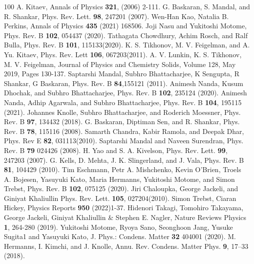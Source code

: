 \documentclass[aps,amsmath,twocolumn,amssymb,floatfix,showpacs,superscriptaddress,nofootinbib,longbibliography]{revtex4-1}
\begin{document}
{}
\begin{thebibliography}{100}
A. Kitaev, Annals of Physics {\bf 321}, (2006) 2-111.
G. Baskaran, S. Mandal, and R. Shankar, Phys. Rev. Lett. {\bf 98}, 247201 (2007).
Wen-Han Kao, Natalia B. Perkins, Annals of Physics {\bf 435} (2021) 168506.
 Joji Nasu and Yukitoshi Motome, Phys. Rev. B {\bf 102}, 054437 (2020). 
Tathagata Chowdhury, Achim Rosch, and Ralf Bulla, Phys. Rev. B {\bf 101}, 115133(2020).
 K. S. Tikhonov, M. V. Feigelman,  and A. Yu. Kitaev, Phys. Rev. Lett {\bf 106}, 067203(2011).
A. V. Lunkin, K. S. Tikhonov, M. V. Feigelman, Journal of Physics and Chemistry Solids, Volume 128, May 2019, Pages 130-137.
Saptarshi Mandal, Subhro Bhattacharjee, K Sengupta, R Shankar, G Baskaran, Phys. Rev. B {\bf 84},155121 (2011).
Animesh Nanda, Kusum Dhochak, and Subhro Bhattacharjee, Phys. Rev. B {\bf 102}, 235124 (2020).
Animesh Nanda, Adhip Agarwala, and Subhro Bhattacharjee, Phys. Rev. B {\bf 104}, 195115 (2021).
Johannes Knolle, Subhro Bhattacharjee, and Roderich Moessner, Phys. Rev. B {\bf 97}, 134432 (2018).
G. Baskaran, Diptiman Sen, and R. Shankar, Phys. Rev. B {\bf 78}, 115116 (2008).
Samarth Chandra, Kabir Ramola, and Deepak Dhar, Phys. Rev E {\bf 82}, 031113(2010).
Saptarshi Mandal and Naveen Surendran, Phys. Rev. B {\bf 79} 024426 (2008).
H. Yao and S. A. Kivelson, Phys. Rev. Lett. {\bf 99}, 247203 (2007).
G. Kells, D. Mehta, J. K. Slingerland, and J. Vala, Phys. Rev. B {\bf 81}, 104429 (2010).
 Tim Eschmann, Petr A. Mishchenko, Kevin O’Brien, Troels A. Bojesen, Yasuyuki Kato, Maria Hermanns, Yukitoshi Motome, and Simon Trebst, Phys. Rev. B {\bf 102}, 075125 (2020).
Jiri Chaloupka, George Jackeli, and Giniyat Khaliullin Phys. Rev. Lett. {\bf 105}, 027204(2010).
 Simon Trebst, Ciaran Hickey, Physics Reports {\bf 950} (2022)1-37.
 Hidenori Takagi, Tomohiro Takayama, George Jackeli, Giniyat Khaliullin \& Stephen E. Nagler, Nature Reviews Physics {\bf 1}, 264-280 (2019).
Yukitoshi Motome, Ryoya Sano, Seonghoon Jang, Yusuke Sugita1 and Yasuyuki Kato,  J. Phys.: Condens. Matter {\bf 32} 404001 (2020).
M. Hermanns, I. Kimchi, and J. Knolle, Annu. Rev. Condens. Matter Phys. {\bf 9}, 17–33 (2018).

\end{thebibliography}
\end{document}
